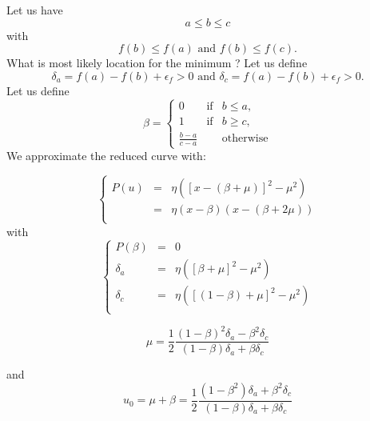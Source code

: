 \documentclass[aps,12pt]{revtex4}
\begin{document}
Let us have 
$$a \leq b \leq c$$ 
with 
$$f(b)\leq f(a) \text{ and } f(b)\leq f(c).$$
What is most likely location for the minimum ?
Let us define $$\delta_a = f(a)-f(b) + \epsilon_f > 0 \text{ and } \delta_c = f(a)-f(b) + \epsilon_f > 0.$$ 
Let us define 
$$
	\beta = 
	\left\lbrace
	\begin{array}{rcl}
	0 & \text{if} & b\leq a,\\
	1 & \text{if} & b\geq c,\\
	\frac{b-a}{c-a} & & \text{otherwise}
	\end{array}
	\right.
$$
We approximate the reduced curve with:

\begin{equation}
\left\lbrace
\begin{array}{rcl}
	P(u) & = & \eta \left( \left[ x -(\beta+\mu)\right]^2 - \mu^2 \right)\\
	 & = & \eta(x-\beta)(x-(\beta+2\mu))\\
\end{array}
\right.
\end{equation}
with
\begin{equation}
	\left\lbrace
	\begin{array}{rcl}
	P(\beta) & = & 0\\
	\delta_a & = & \eta \left( [\beta+\mu]^2 - \mu^2 \right)\\
 	\delta_c & = & \eta \left( [ (1-\beta)+\mu]^2 - \mu^2 \right)\\
	\end{array}
	\right.
\end{equation}

\begin{equation}
	\mu = \dfrac{1}{2} \dfrac{(1-\beta)^2\delta_a - \beta^2 \delta_c}{(1-\beta)\delta_a + \beta \delta_c}
\end{equation}

and
\begin{equation}
	u_0=	\mu + \beta = \dfrac{1}{2} \dfrac{(1-\beta^2) \delta_a + \beta^2 \delta_c}{(1-\beta)\delta_a + \beta \delta_c}
\end{equation}
\end{document}
